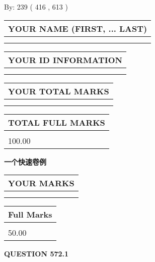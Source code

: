 \documentclass{ctexart}
\begin{document}
   
\hspace{1.0in} By: 
 239 ( 416 ,  613 )
   
   
   
   
\newpage 
\setcounter{page}{ 
   572001 } 
   
   
   
   
\noindent\begin{tabular}{|l|}
\hline
YOUR NAME (FIRST, ... LAST)  \\
\hline
 \\ 
 \\ 
\hline
\end{tabular}
\hspace{0.05in} \begin{tabular}{|l|}
\hline
 YOUR   ID   INFORMATION  \\
\hline
 \\ 
 \\ 
\hline
\end{tabular}
   
   
\vspace{0.2in}\noindent\begin{tabular}{|l|}
\hline
YOUR TOTAL MARKS  \\
\hline
 \\ 
 \\ 
\hline
\end{tabular}
\hspace{0.05in} \begin{tabular}{|l|}
\hline
TOTAL FULL MARKS  \\
\hline
 \\ 
100.00 \\
\hline
\end{tabular}
   
   
 \vspace{0.2in}
{\LARGE {\textbf{ 一个快速卷例}}}
   
   
  
\vspace{0.2in}
  
\noindent\begin{tabular}{|l|}
\hline
 YOUR MARKS  \\
\hline
 \\ 
 \\ 
\hline
\end{tabular}
\hspace{0.05in} \begin{tabular}{|l|}
\hline
 Full Marks  \\
\hline
 \\ 
50.00 \\
\hline
\end{tabular}
{\textbf{\Large{QUESTION
572.1 
}}}
  
\end{document}
